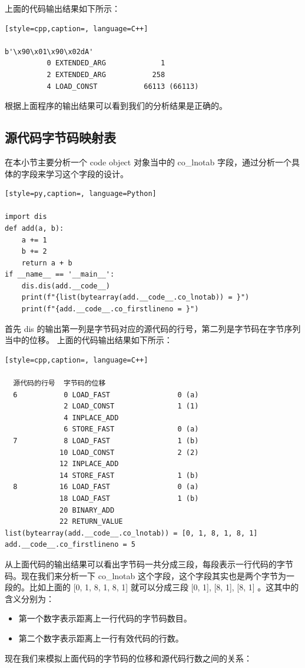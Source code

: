 上面的代码输出结果如下所示：
\begin{lstlisting}[style=cpp,caption=, language=C++]

b'\x90\x01\x90\x02dA'
          0 EXTENDED_ARG             1
          2 EXTENDED_ARG           258
          4 LOAD_CONST           66113 (66113)
\end{lstlisting}
根据上面程序的输出结果可以看到我们的分析结果是正确的。
\subsection{源代码字节码映射表}
在本小节主要分析一个 code object 对象当中的 co\_lnotab 字段，通过分析一个具体的字段来学习这个字段的设计。
\begin{lstlisting}[style=py,caption=, language=Python]

import dis
def add(a, b):
    a += 1
    b += 2
    return a + b
if __name__ == '__main__':
    dis.dis(add.__code__)
    print(f"{list(bytearray(add.__code__.co_lnotab)) = }")
    print(f"{add.__code__.co_firstlineno = }")
\end{lstlisting}
首先 dis 的输出第一列是字节码对应的源代码的行号，第二列是字节码在字节序列当中的位移。
上面的代码输出结果如下所示：
\begin{lstlisting}[style=cpp,caption=, language=C++]

  源代码的行号  字节码的位移
  6           0 LOAD_FAST                0 (a)
              2 LOAD_CONST               1 (1)
              4 INPLACE_ADD
              6 STORE_FAST               0 (a)
  7           8 LOAD_FAST                1 (b)
             10 LOAD_CONST               2 (2)
             12 INPLACE_ADD
             14 STORE_FAST               1 (b)
  8          16 LOAD_FAST                0 (a)
             18 LOAD_FAST                1 (b)
             20 BINARY_ADD
             22 RETURN_VALUE
list(bytearray(add.__code__.co_lnotab)) = [0, 1, 8, 1, 8, 1]
add.__code__.co_firstlineno = 5
\end{lstlisting}
从上面代码的输出结果可以看出字节码一共分成三段，每段表示一行代码的字节码。现在我们来分析一下 co\_lnotab 这个字段，这个字段其实也是两个字节为一段的。比如上面的 [0, 1, 8, 1, 8, 1] 就可以分成三段 [0, 1], [8, 1], [8, 1] 。这其中的含义分别为：
\begin{itemize}
\item 第一个数字表示距离上一行代码的字节码数目。
\item 第二个数字表示距离上一行有效代码的行数。
\end{itemize}
现在我们来模拟上面代码的字节码的位移和源代码行数之间的关系：
